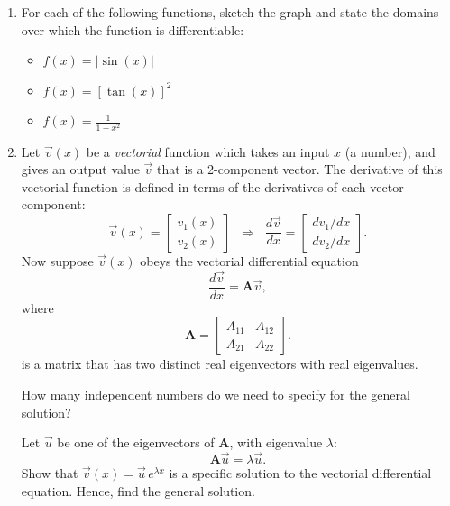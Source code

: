 \documentclass[10pt,a4paper]{article}
\begin{document}
\begin{enumerate}
\item
For each of the following functions, sketch the graph and state the
domains over which the function is differentiable:

\begin{itemize}
  \item $f(x) = |\sin(x)|$

  \item $f(x) = \left[\tan(x)\right]^2$

  \item $f(x) = \frac{1}{1-x^2}$
\end{itemize}

\item
  Let $\vec{v}(x)$ be a \textit{vectorial} function which takes an input
$x$ (a number), and gives an output value $\vec{v}$ that is a
2-component vector. The derivative of this vectorial function is defined
in terms of the derivatives of each vector component:
\begin{equation}
\vec{v}(x) = \begin{bmatrix}v_1(x) \\ v_2(x)\end{bmatrix} \;\; \Rightarrow \;\; \frac{d\vec{v}}{dx} = \begin{bmatrix}dv_1/dx \\ dv_2/dx\end{bmatrix}.
\end{equation}
Now suppose $\vec{v}(x)$ obeys the vectorial differential equation
\begin{equation}
\frac{d\vec{v}}{dx} = \mathbf{A} \vec{v},
\end{equation}
where
\begin{equation}
\mathbf{A} = \begin{bmatrix}A_{11} & A_{12} \\ A_{21} & A_{22}\end{bmatrix}.
\end{equation}
is a matrix that has two distinct real eigenvectors with real
eigenvalues.

How many independent numbers do we need to specify for the general
solution?

Let $\vec{u}$ be one of the eigenvectors of $\mathbf{A}$, with
eigenvalue $\lambda$:
\begin{equation}
\mathbf{A} \vec{u} = \lambda \vec{u}.
\end{equation}
Show that $\vec{v}(x) = \vec{u}\, e^{\lambda x}$ is a specific
solution to the vectorial differential equation. Hence, find the general
solution.
\end{enumerate}
\end{document}

